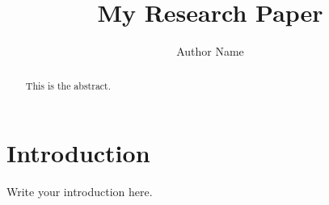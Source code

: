 \documentclass[conference]{IEEEtran}
\title{My Research Paper}
\author{Author Name}
\begin{document}
\maketitle
\begin{abstract}
This is the abstract.
\end{abstract}
\section{Introduction}
Write your introduction here.
\end{document}

